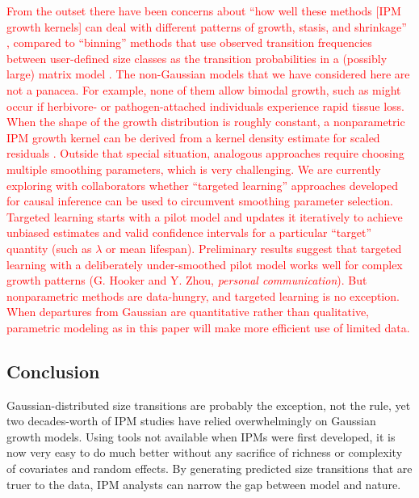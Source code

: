 \documentclass[12pt]{article}
\newcommand{\new}{\textcolor{red}}
\begin{document}
\new{From the outset there have been concerns about ``how well these methods [IPM growth kernels] can deal with different patterns of growth, stasis, and shrinkage'' \citep[][p. 200]{morris-doak-2002}, compared to ``binning'' methods that use observed transition frequencies between 
user-defined size classes as the transition probabilities in a (possibly large) matrix model \citep{doak-critical-2021}. 
The non-Gaussian models that we have considered here are not a panacea. 
For example, none of them allow bimodal growth, such as might occur if herbivore- or pathogen-attached individuals experience rapid tissue loss. 
When the shape of the growth distribution is roughly constant, a nonparametric IPM growth kernel can be derived from a kernel density estimate for scaled residuals \citep[][p. 288]{ellner-etal-2016}. 
Outside that special situation, analogous approaches require choosing multiple smoothing parameters, which is very challenging. 
We are currently exploring with collaborators whether ``targeted learning'' approaches developed for causal inference \citep{vande-rose-2011} can be used to circumvent smoothing parameter selection. Targeted learning starts with a pilot model and updates it iteratively to achieve unbiased estimates and valid confidence intervals for a particular ``target'' quantity (such as $\lambda$ or mean lifespan). Preliminary results suggest that targeted learning with a deliberately under-smoothed pilot model works well for complex growth patterns (G. Hooker and Y. Zhou, \emph{personal communication}). But nonparametric methods are data-hungry, and targeted learning is no exception. When departures from Gaussian are quantitative rather than qualitative, parametric modeling as in this paper will make more efficient use of limited data.} 

 \subsection*{Conclusion}
Gaussian-distributed size transitions are probably the exception, not the rule, yet two decades-worth of IPM studies have relied overwhelmingly on Gaussian growth models. 
Using tools not available when IPMs were first developed, it is now very easy to do much better without any sacrifice of richness or complexity of covariates and random effects. 
By generating predicted size transitions that are truer to the data, IPM analysts can narrow the gap between model and nature. 

\newpage 


\end{document}
